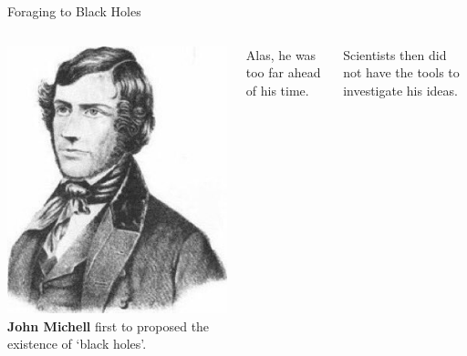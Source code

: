 \documentclass{beamer}
\begin{document}
\begin{frame}{Foraging to Black Holes}
    \begin{columns}
        \centering
        \includegraphics[width=\textwidth]{asset/michell.jpg}
        \centering
        \textbf{John Michell} first to proposed the existence of `black holes'.

        \vspace{0.5cm}

        Alas, he was too far ahead of his time.

        \vspace{0.5cm}

        Scientists then did not have the tools to investigate his ideas.
    \end{columns}

\end{frame}
\end{document}
